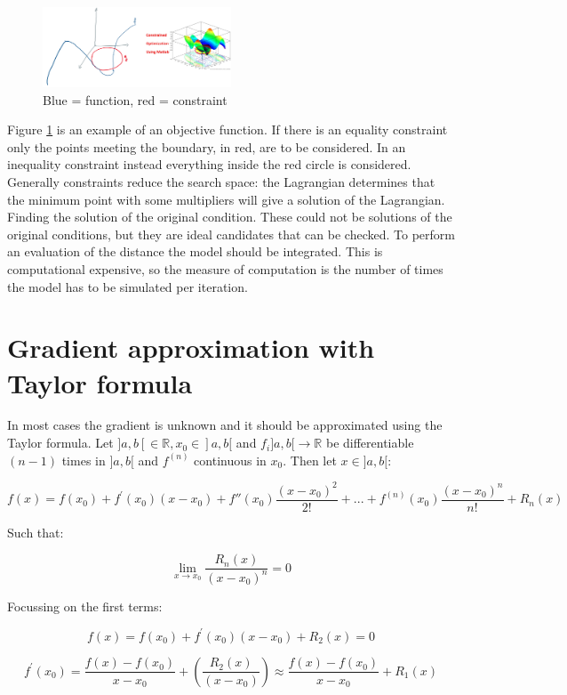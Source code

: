   \begin{figure}[H]
    \centering
    \includegraphics[width=0.5\textwidth]{example.png}
    \caption{Blue = function, red = constraint}
    \label{fig:ex}
  \end{figure}

  Figure \ref{fig:ex} is an example of an objective function.
  If there is an equality constraint only the points meeting the boundary, in red, are to be considered.
  In an inequality constraint instead everything inside the red circle is considered.
  Generally constraints reduce the search space: the Lagrangian determines that the minimum point with some multipliers will give a solution of the Lagrangian.
  Finding the solution of the original condition.
  These could not be solutions of the original conditions, but they are ideal candidates that can be checked.
  To perform an evaluation of the distance the model should be integrated.
  This is computational expensive, so the measure of computation is the number of times the model has to be simulated per iteration.

\section{Gradient approximation with Taylor formula}
In most cases the gradient is unknown and it should be approximated using the Taylor formula.
Let $]a,b[ \in \mathbb{R}, x_0 \in ]a,b[$ and $f_i]a,b[ \rightarrow \mathbb{R}$ be differentiable $(n-1)$ times in $]a,b[$ and $f^{(n)}$ continuous in $x_0$.
Then let $x \in ]a,b[$:

$$f(x)=f\left(x_0\right)+f^{\prime}\left(x_0\right)\left(x-x_0\right)+f''(x_0)\frac{(x-x_0)^2}{2!}+ ...+ f^{(n)}(x_0)\frac{(x-x_0)^n}{n!} + R_n(x)$$

Such that:

$$\lim_{x \rightarrow x_0} \frac{R_n(x)}{(x-x_0)^n} =0$$

Focussing on the first terms:

$$f(x)=f\left(x_0\right)+f^{\prime}\left(x_0\right)\left(x-x_0\right)+R_2(x)=0$$

$$f^{\prime}\left(x_0\right)= \frac{f(x)-f(x_0)}{x-x_0}+\left(\frac{R_2(x)}{(x-x_0)}\right)\approx\frac{f(x)-f\left(x_0\right)}{x-x_0}+R_1(x)$$

